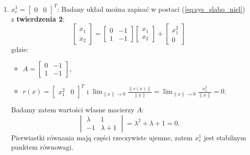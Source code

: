 \documentclass{article}
\begin{document}
        \begin{enumerate}
            \item $x_{e}^{1} = \begin{bmatrix} 0 & 0 \end{bmatrix}^{T}$:
            Badany układ można zapisać w postaci (\ref{eq:sys_slabo_niel}) z \textbf{twierdzenia 2}:
            $$
                \begin{bmatrix} \dot{x}_{1} \\ \dot{x}_{2} \end{bmatrix}
                =
                \begin{bmatrix} 0 & -1 \\ 1 & -1 \end{bmatrix}
                \begin{bmatrix} x_{1} \\ x_{2} \end{bmatrix}
                +
                \begin{bmatrix} x_{1}^{2} \\ 0 \end{bmatrix}
            $$
            gdzie:
            \begin{itemize}
                \item $A = \begin{bmatrix} 0 & -1 \\ 1 & -1 \end{bmatrix}$,
                \item $r(x) = \begin{bmatrix} x_{1}^{2} & 0 \end{bmatrix}^{T}$ i $\lim_{\lVert x \rVert \rightarrow 0}\frac{\lVert r(x) \rVert}{\lVert x \rVert} = \lim_{\lVert x \rVert \rightarrow 0}\frac{x_{1}^{2}}{\lVert x \rVert} = 0$.
            \end{itemize}
            Badamy zatem wartości własne macierzy $A$:
            $$
                \begin{vmatrix} \lambda & 1\\ -1 & \lambda + 1 \end{vmatrix} = \lambda^{2} + \lambda + 1 = 0.
            $$
            Pierwiastki równania mają części rzeczywiste ujemne, zatem $x_{e}^{1}$ jest stabilnym punktem równowagi.
            

\end{enumerate}
\end{document}
